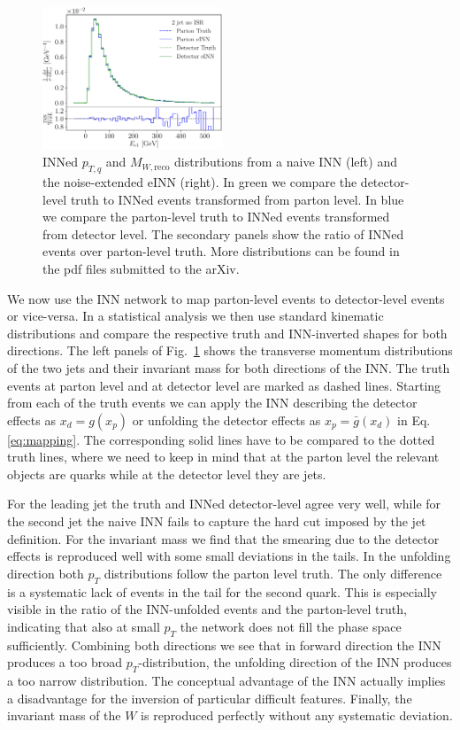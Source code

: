 \begin{figure}[t]
\includegraphics[page=32, width=0.48\textwidth]{figures/cINN/INN_FineTune}
\caption{INNed $p_{T,q}$ and $M_{W,\text{reco}}$ distributions from a
  naive INN (left) and the noise-extended eINN (right). In green we
  compare the detector-level truth to INNed events transformed from
  parton level. In blue we compare the parton-level truth to INNed
  events transformed from detector level. The secondary panels show
  the ratio of INNed events over parton-level truth. More
  distributions can be found in the pdf files submitted to the arXiv.}
\label{fig:UnfoldCurve}
\end{figure}

We now use the INN network to map parton-level events to
detector-level events or vice-versa. In a statistical analysis we then
use standard kinematic distributions and compare the respective truth
and INN-inverted shapes for both directions. The left panels of
Fig.~\ref{fig:UnfoldCurve} shows the transverse momentum distributions
of the two jets and their invariant mass for both directions of the
INN. The truth events at parton level and at detector level are marked
as dashed lines. Starting from each of the truth events we can apply
the INN describing the detector effects as $x_d = g(x_p)$ or unfolding
the detector effects as $x_p = \bar{g}(x_d)$ in
Eq.\eqref{eq:mapping}. The corresponding solid lines have to be
compared to the dotted truth lines, where we need to keep in mind that
at the parton level the relevant objects are quarks while at the
detector level they are jets.

For the leading jet the truth and INNed detector-level agree very
well, while for the second jet the naive INN fails to capture the hard
cut imposed by the jet definition. For the invariant mass we find that
the smearing due to the detector effects is reproduced well with some
small deviations in the tails. In the unfolding direction both $p_T$
distributions follow the parton level truth. The only difference is a
systematic lack of events in the tail for the second quark. This is
especially visible in the ratio of the INN-unfolded events and the
parton-level truth, indicating that also at small $p_T$ the network
does not fill the phase space sufficiently. Combining both directions
we see that in forward direction the INN produces a too broad
$p_T$-distribution, the unfolding direction of the INN produces a too
narrow distribution.  The conceptual advantage of the INN actually
implies a disadvantage for the inversion of particular difficult
features.  Finally, the invariant mass of the $W$ is reproduced
perfectly without any systematic deviation.

